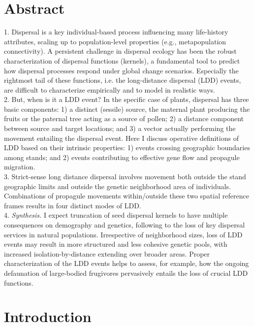 \documentclass[a4paper, 12pt]{article}
\begin{document}
\section*{Abstract}
\begin{linenumbers}

1. Dispersal is a key individual-based process influencing many life-history attributes, scaling up to population-level properties (e.g., metapopulation connectivity). A persistent challenge in dispersal ecology has been the robust characterization of dispersal functions (kernels), a fundamental tool to predict how dispersal processes respond under global change scenarios. Especially the rightmost tail of these functions, i.e. the long-distance dispersal (LDD) events, are difficult to characterize empirically and to model in realistic ways. \\
2. But, when is it a LDD event? In the specific case of plants, dispersal has three basic components: 1) a distinct (sessile) source, the maternal plant producing the fruits or the paternal tree acting as a source of pollen; 2) a distance component between source and target locations; and 3) a vector actually performing the movement entailing the dispersal event. Here I discuss operative definitions of LDD based on their intrinsic properties: 1) events crossing geographic boundaries among stands; and 2) events contributing to effective gene flow and propagule migration. \\
3. Strict-sense long distance dispersal involves movement both outside the stand geographic limits and outside the genetic neighborhood area of individuals. Combinations of propagule movements within/outside these two spatial reference frames results in four distinct modes of LDD. \\
4. \textit{Synthesis.} I expect truncation of seed dispersal kernels to have multiple consequences on demography and genetics, following to the loss of key dispersal services in natural populations. Irrespective of neighborhood sizes, loss of LDD events may result in more structured and less cohesive genetic pools, with increased isolation-by-distance extending over broader areas. Proper characterization of the LDD events helps to assess, for example, how the ongoing defaunation of large-bodied frugivores pervasively entails the loss of crucial LDD functions.\\

\newpage

\section*{Introduction}


\end{linenumbers}
\end{document}
